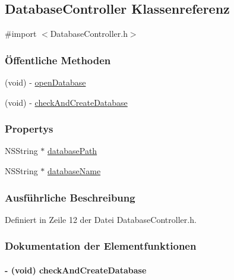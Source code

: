 \hypertarget{interface_database_controller}{
\subsection{DatabaseController Klassenreferenz}
\label{interface_database_controller}
}


{\ttfamily \#import $<$DatabaseController.h$>$}\subsubsection*{Öffentliche Methoden}
\begin{DoxyCompactItemize}
\item 
(void) -\/ \hyperlink{interface_database_controller_a017e1d00d2ab97ae34771688b2e7ecca}{openDatabase}
\item 
(void) -\/ \hyperlink{interface_database_controller_a474e837eaaf05259fae1097b04aae5bf}{checkAndCreateDatabase}
\end{DoxyCompactItemize}
\subsubsection*{Propertys}
\begin{DoxyCompactItemize}
\item 
NSString $\ast$ \hyperlink{interface_database_controller_aa593318b53fcf8cbe5b550ec7b00a6d6}{databasePath}
\item 
NSString $\ast$ \hyperlink{interface_database_controller_a921a7b3cf192bf2380264f18ed2896a5}{databaseName}
\end{DoxyCompactItemize}


\subsubsection{Ausführliche Beschreibung}


Definiert in Zeile 12 der Datei DatabaseController.h.

\subsubsection{Dokumentation der Elementfunktionen}
\hypertarget{interface_database_controller_a474e837eaaf05259fae1097b04aae5bf}{
\paragraph[{checkAndCreateDatabase}]{\setlength{\rightskip}{0pt plus 5cm}-\/ (void) checkAndCreateDatabase }\hfill}
\label{interface_database_controller_a474e837eaaf05259fae1097b04aae5bf}


